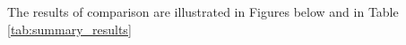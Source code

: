 
The results of comparison are illustrated in Figures below and in Table \ref{tab:summary_results}


